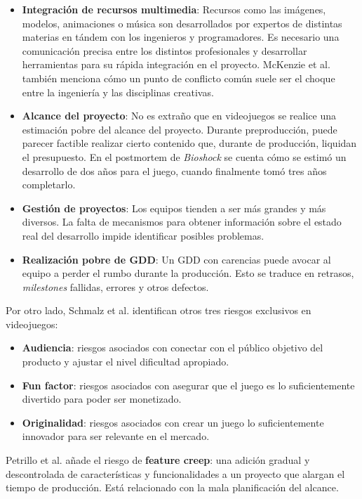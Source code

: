 \begin{itemize}
    \item \textbf{Integración de recursos multimedia}: Recursos como las imágenes, modelos, animaciones o música son desarrollados por expertos de distintas materias en tándem con los ingenieros y programadores. Es necesario una comunicación precisa entre los distintos profesionales y desarrollar herramientas para su rápida integración en el proyecto. McKenzie et al. también menciona cómo un punto de conflicto común suele ser el choque entre la ingeniería y las disciplinas creativas.
    \item \textbf{Alcance del proyecto}: No es extraño que en videojuegos se realice una estimación pobre del alcance del proyecto. Durante preproducción, puede parecer factible realizar cierto contenido que, durante de producción, liquidan el presupuesto. En el postmortem de \textit{Bioshock} \cite{bioshock} se cuenta cómo se estimó un desarrollo de dos años para el juego, cuando finalmente tomó tres años completarlo.
    \item \textbf{Gestión de proyectos}: Los equipos tienden a ser más grandes y más diversos. La falta de mecanismos para obtener información sobre el estado real del desarrollo impide identificar posibles problemas.
    \item \textbf{Realización pobre de GDD}: Un GDD con carencias puede avocar al equipo a perder el rumbo durante la producción. Esto se traduce en retrasos, \textit{milestones} fallidas, errores y otros defectos.
\end{itemize}

Por otro lado, Schmalz et al. identifican otros tres riesgos exclusivos en videojuegos:

\begin{itemize}
    \item \textbf{Audiencia}: riesgos asociados con conectar con el público objetivo del producto y ajustar el nivel dificultad apropiado.
    \item \textbf{Fun factor}: riesgos asociados con asegurar que el juego es lo suficientemente divertido para poder ser monetizado.
    \item \textbf{Originalidad}: riesgos asociados con crear un juego lo suficientemente innovador para ser relevante en el mercado.
\end{itemize}

Petrillo et al. \cite{petrillo} añade el riesgo de \textbf{feature creep}: una adición gradual y descontrolada de características y funcionalidades a un proyecto que alargan el tiempo de producción. Está relacionado con la mala planificación del alcance.

